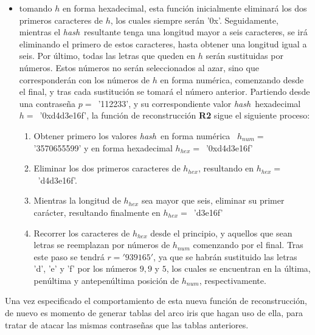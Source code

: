 \documentclass[12pt,spanish,listoffigures,listoftables]{tfgetsinf}
\newcommand{\hash}{\textit{hash}}
\begin{document}
\begin{itemize}

	\item tomando $h$ en forma hexadecimal, esta función inicialmente eliminará los dos primeros caracteres de $h$, los cuales siempre serán '0x'. Seguidamente, mientras el \hash~resultante tenga una longitud mayor a seis caracteres, se irá eliminando el primero de estos caracteres, hasta obtener una longitud igual a seis. Por último, todas las letras que queden en $h$ serán sustituidas por números. Estos números no serán seleccionados al azar, sino que corresponderán con los números de $h$ en forma numérica, comenzando desde el final, y tras cada sustitución se tomará el número anterior. Partiendo desde una contraseña $p =$~'112233', y su correspondiente valor \hash~hexadecimal $h =$~'0xd4d3e16f', la función de reconstrucción \textbf{R2} sigue el siguiente proceso:

		\begin{enumerate}
				
			\item Obtener primero los valores \hash~en forma numérica ~$h_{num} =$'3570655599' y en forma hexadecimal $h_{hex} =$~'0xd4d3e16f'

			\item Eliminar los dos primeros caracteres de $h_{hex}$, resultando en $h_{hex} =$~'d4d3e16f'.
		
			\item Mientras la longitud de $h_{hex}$ sea mayor que seis, eliminar su primer carácter, resultando finalmente en $h_{hex} =$~'d3e16f'
		
			\item Recorrer los caracteres de $h_{hex}$ desde el principio, y aquellos que sean letras se reemplazan por números de $h_{num}$ comenzando por el final. Tras este paso se tendrá $r = '939165'$, ya que se habrán sustituido las letras 'd', 'e' y 'f' por los números $9, 9$ y $5$, los cuales se encuentran en la última, penúltima y antepenúltima posición de $h_{num}$, respectivamente.

		\end{enumerate}

\end{itemize}

Una vez especificado el comportamiento de esta nueva función de reconstrucción, de nuevo es momento de generar tablas del arco iris que hagan uso de ella, para tratar de atacar las mismas contraseñas que las tablas anteriores.
\end{document}
